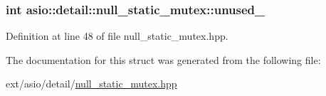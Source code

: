 \subsubsection[{unused\+\_\+}]{\setlength{\rightskip}{0pt plus 5cm}int asio\+::detail\+::null\+\_\+static\+\_\+mutex\+::unused\+\_\+}\label{structasio_1_1detail_1_1null__static__mutex_a0cfc4860ac23ca375273e89b27c94f05}


Definition at line 48 of file null\+\_\+static\+\_\+mutex.\+hpp.



The documentation for this struct was generated from the following file\+:\begin{DoxyCompactItemize}
\item 
ext/asio/detail/\hyperlink{null__static__mutex_8hpp}{null\+\_\+static\+\_\+mutex.\+hpp}\end{DoxyCompactItemize}
